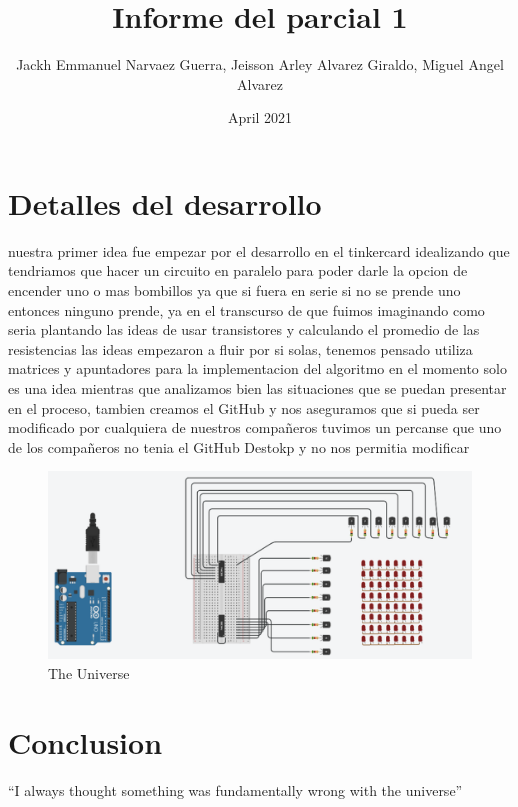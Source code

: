 \documentclass{article}
\title{Informe del parcial 1}
\author{Jackh Emmanuel Narvaez Guerra, Jeisson Arley Alvarez Giraldo, Miguel Angel Alvarez}
\date{April 2021}
\begin{document}
\maketitle

\section{Detalles del desarrollo}
nuestra primer idea fue empezar por el desarrollo en el tinkercard idealizando que tendriamos que hacer un circuito en paralelo para poder darle la opcion de encender uno o mas bombillos ya que si fuera en serie si no se prende uno entonces ninguno prende, ya en el transcurso de que fuimos imaginando como seria plantando las ideas de usar transistores y calculando el promedio de las resistencias las ideas empezaron a fluir por si solas, tenemos pensado utiliza matrices y apuntadores para la implementacion del algoritmo en el momento solo es una idea mientras que analizamos bien las situaciones que se puedan presentar en el proceso, tambien creamos el GitHub y nos aseguramos que si pueda ser modificado por cualquiera de nuestros compañeros tuvimos un percanse que uno de los compañeros no tenia el GitHub Destokp y no nos permitia modificar 

\begin{figure}[h!]
\centering
\includegraphics[scale=1.7]{imagen.png}
\caption{The Universe}
\label{fig:universe}
\end{figure}

\section{Conclusion}
``I always thought something was fundamentally wrong with the universe'' \citep{adams1995hitchhiker}



\end{document}
